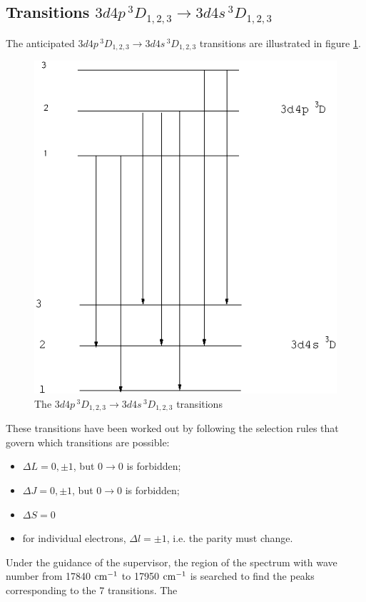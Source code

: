 \documentclass[a4paper]{article}
\begin{document}
\subsection{Transitions $3d4p\,^3D_{1,2,3} \to 3d4s\,^3D_{1,2,3}$}
The anticipated $3d4p\,^3D_{1,2,3} \to 3d4s\,^3D_{1,2,3}$ transitions
are illustrated in figure \ref{fig:transition1}.
\begin{figure}[htb!]
\centering
\includegraphics[scale=0.35]{transition1}
\caption{The $3d4p\,^3D_{1,2,3} \to 3d4s\,^3D_{1,2,3}$ transitions}
\label{fig:transition1}
\end{figure}
These transitions have been worked out by following the selection
rules that govern which transitions are possible:
\begin{itemize}
\item $\Delta L = 0, \pm 1$, but $0 \to 0$ is forbidden;
\item $\Delta J = 0, \pm 1$, but $0 \to 0$ is forbidden;
\item $\Delta S = 0$
\item for individual electrons, $\Delta l = \pm 1$, i.e. the parity
  must change.
\end{itemize}
Under the guidance of the supervisor, the region of the spectrum with
wave number from 17840 $\rm cm^{-1}$ to 17950 $\rm cm^{-1}$ is
searched to find the peaks corresponding to the 7 transitions. The
\end{document}
